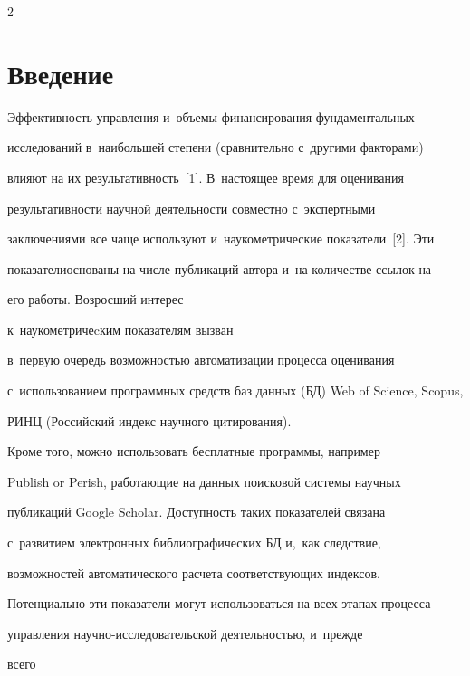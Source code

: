 \begin{multicols}{2}



\label{st\stat}

    

    \section{Введение}

    

    Эффективность управления и~объемы фи\-нансирования фундаментальных 

исследований в~наиболь\-шей степени (сравнительно с~другими факторами) 

влияют на их результативность~[1]. В~настоящее время для оценивания 

результативности научной деятельности совместно с~экс\-пертными 

заключениями все чаще используют и~наукометрические показатели~[2]. Эти 

показатели\linebreak основаны на числе публикаций автора и~на количестве ссылок на 

его работы. Возросший интерес\linebreak

 к~наукометричеcким показателям вызван 

в~первую очередь возможностью автоматизации процесса оценивания 

с~использованием программных средств баз данных (БД)  Web of Science, Scopus, 

РИНЦ (Российский индекс научного цитирования). 

Кроме того, можно использовать бесплатные программы, например 

Publish or Perish, ра\-бо\-тающие на данных поисковой системы научных\linebreak 

пуб\-ли\-ка\-ций Google Scholar. Доступность таких показателей связана 

с~развитием электронных биб\-лио\-гра\-фи\-че\-ских БД и,~как следствие, 

возможностей автоматического расчета соответствующих индексов. 

Потенциально эти показатели могут использоваться на всех этапах процесса 

управления на\-уч\-но-ис\-сле\-до\-ва\-тель\-ской деятельностью, и~преж\-де 

всего




\end{multicols}
